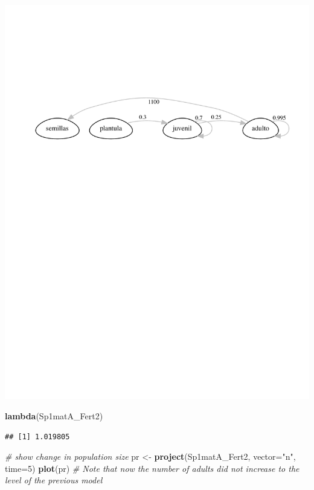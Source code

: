 \documentclass[
]{book}
\newenvironment{Shaded}{\begin{snugshade}}{\end{snugshade}}
\newcommand{\AttributeTok}[1]{\textcolor[rgb]{0.13,0.29,0.53}{#1}}
\newcommand{\CommentTok}[1]{\textcolor[rgb]{0.56,0.35,0.01}{\textit{#1}}}
\newcommand{\DecValTok}[1]{\textcolor[rgb]{0.00,0.00,0.81}{#1}}
\newcommand{\FunctionTok}[1]{\textcolor[rgb]{0.13,0.29,0.53}{\textbf{#1}}}
\newcommand{\NormalTok}[1]{#1}
\newcommand{\OtherTok}[1]{\textcolor[rgb]{0.56,0.35,0.01}{#1}}
\newcommand{\StringTok}[1]{\textcolor[rgb]{0.31,0.60,0.02}{#1}}
\theoremstyle{definition}
\theoremstyle{definition}
\theoremstyle{definition}
\theoremstyle{definition}
\theoremstyle{remark}
\begin{document}
\includegraphics{Diagnostico_Poblacional_files/figure-latex/unnamed-chunk-46-1.pdf}

\begin{Shaded}
\begin{Highlighting}[]
\FunctionTok{lambda}\NormalTok{(Sp1matA\_Fert2)}
\end{Highlighting}
\end{Shaded}

\begin{verbatim}
## [1] 1.019805
\end{verbatim}

\begin{Shaded}
\begin{Highlighting}[]
\CommentTok{\# show change in population size}
\NormalTok{pr }\OtherTok{\textless{}{-}} \FunctionTok{project}\NormalTok{(Sp1matA\_Fert2, }\AttributeTok{vector=}\StringTok{"n"}\NormalTok{, }\AttributeTok{time=}\DecValTok{5}\NormalTok{)}
\FunctionTok{plot}\NormalTok{(pr) }\CommentTok{\# Note that now the number of adults did not increase to the level of the previous model}
\end{Highlighting}
\end{Shaded}
\end{document}
